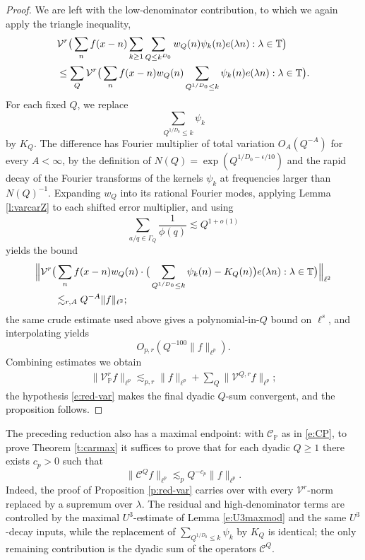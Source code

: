 \documentclass[12pt]{amsart}
\numberwithin{equation}{section}
\theoremstyle{definition}
\begin{document}
\begin{proof}
We are left with the low-denominator contribution, to which we again apply the triangle inequality,
\begin{align}
    &\mathcal{V}^r\big(
    \sum_n f(x-n)\sum_{k \geq 1}\sum_{Q\leq k^{D_0}}
    w_Q(n)\psi_k(n)e(\lambda n):
    \lambda\in\mathbb T
    \big)
    \notag\\
    &\leq
    \sum_Q
    \mathcal{V}^r\big(
    \sum_n f(x-n)w_Q(n)
    \sum_{Q^{1/D_0}\leq k}\psi_k(n)e(\lambda n):
    \lambda\in\mathbb T
    \big).
\end{align}
For each fixed \(Q\), we replace
\[
    \sum_{Q^{1/D_0}\leq k}\psi_k
\]
by \(K_Q\).  The difference has Fourier multiplier of total variation \(O_A(Q^{-A})\)
for every \(A<\infty\), by the definition of \(N(Q)=\exp(Q^{1/D_0-\epsilon/10})\)
and the rapid decay of the Fourier transforms of the kernels \(\psi_k\) at frequencies
larger than \(N(Q)^{-1}\).  Expanding \(w_Q\) into its rational Fourier modes, applying
Lemma \ref{l:varcarZ} to each shifted error multiplier, and using
\[
    \sum_{a/q\in\Gamma_Q}\frac1{\phi(q)}
    \lesssim Q^{1+o(1)}
\]
yields the bound
\begin{align} \label{e:smoothing}
    &\Big\|
    \mathcal{V}^r\big(
    \sum_n f(x-n)w_Q(n) \cdot 
    \big(
    \sum_{Q^{1/D_0}\leq k}\psi_k(n)-K_Q(n)
    \big)
    e(\lambda n):\lambda\in\mathbb T
    \big)
    \Big\|_{\ell^2}
    \notag\\
    &\qquad\lesssim_{r,A}
    Q^{-A}\|f\|_{\ell^2};
\end{align}
the same crude estimate used above gives a polynomial-in-\(Q\) bound on \(\ell^s\), and interpolating yields
\[
    O_{p,r}(Q^{-100}\|f\|_{\ell^p}).
\]
Combining estimates
we obtain
\begin{align}
    \|\mathcal V_{\mathbb P}^{r}f\|_{\ell^p}
    \lesssim_{p,r}
    \|f\|_{\ell^p}
    +
    \sum_Q\|\mathcal V^{Q,r}f\|_{\ell^p};
\end{align}
the hypothesis \eqref{e:red-var} makes the final dyadic \(Q\)-sum convergent, and the
proposition follows.
\end{proof}

The preceding reduction also has a maximal endpoint: with \(\mathcal{C}_{\mathbb{P}}\) as in \eqref{e:CP}, to prove Theorem \ref{t:carmax} it suffices to prove that for each dyadic \(Q\ge 1\) there exists \(c_p>0\) such that
\[
\| \mathcal{C}^Q f\|_{\ell^p}\lesssim_p Q^{-c_p}\|f\|_{\ell^p}. 
\]
Indeed, the proof of Proposition \ref{p:red-var} carries over with every \( \mathcal{V}^r\)-norm replaced by
a supremum over \(\lambda\). The residual and high-denominator terms are controlled
by the maximal \(U^3\)-estimate of Lemma \ref{e:U3maxmod} and the same \(U^3\)-decay inputs,
while the replacement of \(\sum_{Q^{1/D_0}\le k}\psi_k\) by \(K_Q\) is identical; the only remaining contribution is the dyadic sum of the operators \( \mathcal{C}^Q\).
\end{document}
